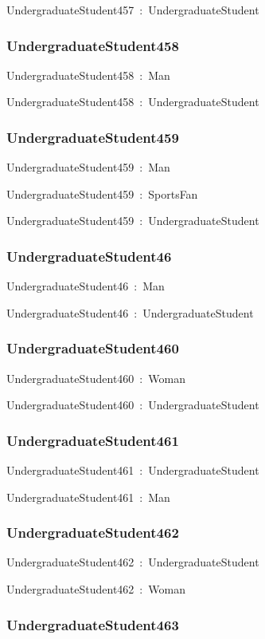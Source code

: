 \documentclass{article}
\begin{document}
UndergraduateStudent457~:~UndergraduateStudent

\subsubsection*{UndergraduateStudent458}

UndergraduateStudent458~:~Man

UndergraduateStudent458~:~UndergraduateStudent

\subsubsection*{UndergraduateStudent459}

UndergraduateStudent459~:~Man

UndergraduateStudent459~:~SportsFan

UndergraduateStudent459~:~UndergraduateStudent

\subsubsection*{UndergraduateStudent46}

UndergraduateStudent46~:~Man

UndergraduateStudent46~:~UndergraduateStudent

\subsubsection*{UndergraduateStudent460}

UndergraduateStudent460~:~Woman

UndergraduateStudent460~:~UndergraduateStudent

\subsubsection*{UndergraduateStudent461}

UndergraduateStudent461~:~UndergraduateStudent

UndergraduateStudent461~:~Man

\subsubsection*{UndergraduateStudent462}

UndergraduateStudent462~:~UndergraduateStudent

UndergraduateStudent462~:~Woman

\subsubsection*{UndergraduateStudent463}
\end{document}
